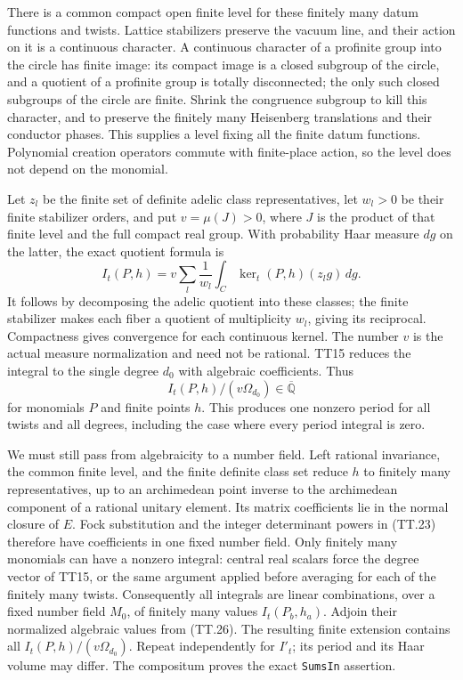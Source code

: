 There is a common compact open finite level for these finitely
many datum functions and twists. Lattice stabilizers preserve the
vacuum line, and their action on it is a continuous character.
A continuous character of a profinite group into the circle has
finite image: its compact image is a closed subgroup of the
circle, and a quotient of a profinite group is totally
disconnected; the only such closed subgroups of the circle are
finite. Shrink the congruence subgroup to kill this character,
and to preserve the finitely many Heisenberg translations and
their conductor phases. This supplies a level fixing all the
finite datum functions. Polynomial creation operators commute
with finite-place action, so the level does not depend on the
monomial.

Let $z_l$ be the finite set of definite adelic class
representatives, let $w_l>0$ be their finite stabilizer orders,
and put $v=\mu(J)>0$, where $J$ is the product of that finite
level and the full compact real group. With probability Haar
measure $dg$ on the latter, the exact quotient formula is
\[
 I_t(P,h)=v\sum_l\frac1{w_l}
                    \int_C\operatorname{ker}_t(P,h)(z_lg)\,dg.
                                                                  \tag{TT.25}
\]
It follows by decomposing the adelic quotient into these classes;
the finite stabilizer makes each fiber a quotient of multiplicity
$w_l$, giving its reciprocal. Compactness gives convergence for
each continuous kernel. The number $v$ is the actual measure
normalization and need not be rational. TT15 reduces the integral
to the single degree $d_0$ with algebraic coefficients. Thus
\[
                         I_t(P,h)/(v\Omega_{d_0})
                                      \in\overline{\mathbb Q}     \tag{TT.26}
\]
for monomials $P$ and finite points $h$. This produces one
nonzero period for all twists and all degrees, including the
case where every period integral is zero.

We must still pass from algebraicity to a number field. Left
rational invariance, the common finite level, and the finite
definite class set reduce $h$ to finitely many representatives,
up to an archimedean point inverse to the archimedean component
of a rational unitary element. Its matrix coefficients lie in
the normal closure of $E$. Fock substitution and the integer
determinant powers in (TT.23) therefore have coefficients in one
fixed number field. Only finitely many monomials can have a
nonzero integral: central real scalars force the degree vector
of TT15, or the same argument applied before averaging for each
of the finitely many twists. Consequently all integrals are
linear combinations, over a fixed number field $M_0$, of finitely
many values $I_t(P_b,h_a)$. Adjoin their normalized algebraic
values from (TT.26). The resulting finite extension contains
all $I_t(P,h)/(v\Omega_{d_0})$. Repeat independently for $I'_t$;
its period and its Haar volume may differ. The compositum proves
the exact \texttt{SumsIn} assertion.

